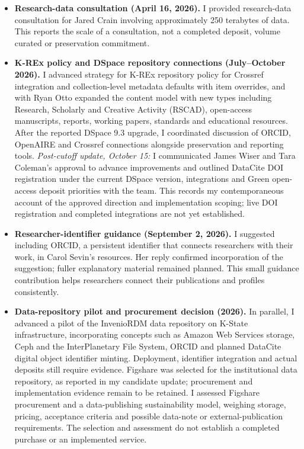 \begin{itemize}
\item \textbf{Research-data consultation (April 16, 2026).} I provided research-data consultation for Jared Crain involving approximately 250 terabytes of data. This reports the scale of a consultation, not a completed deposit, volume curated or preservation commitment.
\item \textbf{K-REx policy and DSpace repository connections (July--October 2026).}\label{update-krex} I advanced strategy for K-REx repository policy for Crossref integration and collection-level metadata defaults with item overrides, and with Ryan Otto expanded the content model with new types including Research, Scholarly and Creative Activity (RSCAD), open-access manuscripts, reports, working papers, standards and educational resources. After the reported DSpace 9.3 upgrade, I coordinated discussion of ORCID, OpenAIRE and Crossref connections alongside preservation and reporting tools. \textit{Post-cutoff update, October 15:} I communicated James Wiser and Tara Coleman's approval to advance improvements and outlined DataCite DOI registration under the current DSpace version, integrations and Green open-access deposit priorities with the team. This records my contemporaneous account of the approved direction and implementation scoping; live DOI registration and completed integrations are not yet established.
\item \textbf{Researcher-identifier guidance (September 2, 2026).} I suggested including ORCID, a persistent identifier that connects researchers with their work, in Carol Sevin's resources. Her reply confirmed incorporation of the suggestion; fuller explanatory material remained planned. This small guidance contribution helps researchers connect their publications and profiles consistently.
\item \textbf{Data-repository pilot and procurement decision (2026).} In parallel, I advanced a pilot of the InvenioRDM data repository on K-State infrastructure, incorporating concepts such as Amazon Web Services storage, Ceph and the InterPlanetary File System, ORCID and planned DataCite digital object identifier minting. Deployment, identifier integration and actual deposits still require evidence. Figshare was selected for the institutional data repository, as reported in my candidate update; procurement and implementation evidence remain to be retained. I assessed Figshare procurement and a data-publishing sustainability model, weighing storage, pricing, acceptance criteria and possible data-note or external-publication requirements. The selection and assessment do not establish a completed purchase or an implemented service.

\end{itemize}

